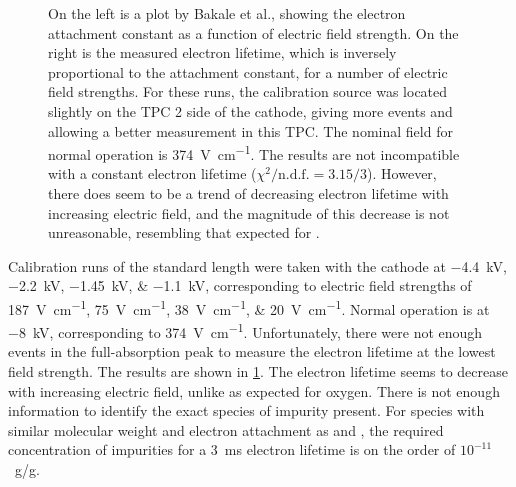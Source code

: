 \documentclass[herrin-thesis.tex]{subfiles}
\begin{document}
\begin{figure}[htb]
\begin{subfigure}[b]{0.55\linewidth}
\end{subfigure}
\caption[Electron lifetime vs. electric field]{On the left is a plot by Bakale et al.\cite{Bakale:1976ly}, showing the electron attachment constant as a function of electric field strength. On the right is the measured electron lifetime, which is inversely proportional to the attachment constant, for a number of electric field strengths. For these runs, the calibration source was located slightly on the TPC 2 side of the cathode, giving more events and allowing a better measurement in this TPC. The nominal field for normal operation is \SI{374}{\V\per\cm}. The results are not incompatible with a constant electron lifetime (\(\chi^2/\text{n.d.f.} = 3.15/3\)). However, there does seem to be a trend of decreasing electron lifetime with increasing electric field, and the magnitude of this decrease is not unreasonable, resembling that expected for .}
\label{fig:el_attachment_vs_efield}
\label{fig:el_lifetime_vs_efield}
\end{figure}

Calibration runs of the standard length were taken with the cathode at \SIlist{-4.4;-2.2;-1.45; -1.1}{\kilo\V}, corresponding to electric field strengths of \SIlist{187;75;38;20}{\V\per\cm}. Normal operation is at \SI{-8}{\kilo\V}, corresponding to \SI{374}{\V\per\cm}. Unfortunately, there were not enough events in the full-absorption peak to measure the electron lifetime at the lowest field strength. The results are shown in \cref{fig:el_lifetime_vs_efield}. The electron lifetime seems to decrease with increasing electric field, unlike as expected for oxygen. There is not enough information to identify the exact species of impurity present. For species with similar molecular weight and electron attachment as  and , the required concentration of impurities for a \SI{3}{\ms} electron lifetime is on the order of \(10^{-11}\)~\si[per-mode=symbol]{\g\per\g}.

%
%
\end{document}
